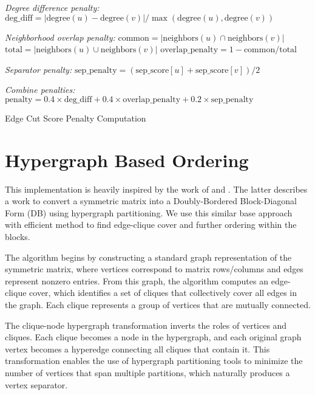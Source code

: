 \begin{algorithm}[H]

    \BlankLine

    \emph{Degree difference penalty:}\;
    $\text{deg\_diff} = |\text{degree}(u) - \text{degree}(v)| / \max(\text{degree}(u), \text{degree}(v))$\;
    \BlankLine

    \emph{Neighborhood overlap penalty:}\;
    $\text{common} = |\text{neighbors}(u) \cap \text{neighbors}(v)|$\;
    $\text{total} = |\text{neighbors}(u) \cup \text{neighbors}(v)|$\;
    $\text{overlap\_penalty} = 1 - \text{common} / \text{total}$\;
    \BlankLine

    \emph{Separator penalty:}\;
    $\text{sep\_penalty} = (\text{sep\_score}[u] + \text{sep\_score}[v]) / 2$\;
    \BlankLine

    \emph{Combine penalties:}\;
    $\text{penalty} = 0.4 \times \text{deg\_diff} + 0.4 \times \text{overlap\_penalty} + 0.2 \times \text{sep\_penalty}$\;

    \;

    \caption{Edge Cut Score Penalty Computation}
    \label{alg:edge_penalty}
\end{algorithm}

\section{Hypergraph Based Ordering}

This implementation is heavily inspired by the work of \cite{catalyurek_hypergraph_2011} and \cite{selvitopi_effect_2020}. The latter describes a work to convert a symmetric matrix into a Doubly-Bordered Block-Diagonal Form (DB) using hypergraph partitioning. We use this similar base approach with efficient method to find edge-clique cover and further ordering within the blocks. 

The algorithm begins by constructing a standard graph representation of the symmetric matrix, where vertices correspond to matrix rows/columns and edges represent nonzero entries. From this graph, the algorithm computes an edge-clique cover, which identifies a set of cliques that collectively cover all edges in the graph. Each clique represents a group of vertices that are mutually connected.

The clique-node hypergraph transformation inverts the roles of vertices and cliques. Each clique becomes a node in the hypergraph, and each original graph vertex becomes a hyperedge connecting all cliques that contain it. This transformation enables the use of hypergraph partitioning tools to minimize the number of vertices that span multiple partitions, which naturally produces a vertex separator.

